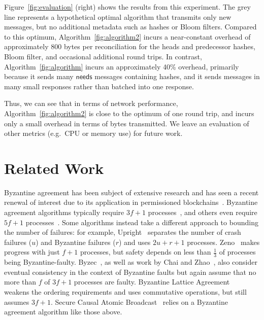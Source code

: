 \documentclass[a4paper,anonymous,USenglish]{lipics-v2019}
\begin{document}
Figure~\ref{fig:evaluation} (right) shows the results from this experiment.
The grey line represents a hypothetical optimal algorithm that transmits only new messages, but no additional metadata such as hashes or Bloom filters.
Compared to this optimum, Algorithm~\ref{fig:algorithm2} incurs a near-constant overhead of approximately 800 bytes per reconciliation for the heads and predecessor hashes, Bloom filter, and occasional additional round trips.
In contrast, Algorithm~\ref{fig:algorithm} incurs an approximately 40\% overhead, primarily because it sends many $\mathsf{needs}$ messages containing hashes, and it sends messages in many small responses rather than batched into one response.

Thus, we can see that in terms of network performance, Algorithm~\ref{fig:algorithm2} is close to the optimum of one round trip, and incurs only a small overhead in terms of bytes transmitted.
We leave an evaluation of other metrics (e.g.\ CPU or memory use) for future work.

\section{Related Work}\label{sec:relwork}

Byzantine agreement has been subject of extensive research and has seen a recent renewal of interest due to its application in permissioned blockchains~\cite{Bano:2019}.
Byzantine agreement algorithms typically require $3f+1$ processes~\cite{Castro:1999,Kotla:2007,Bessani:2014}, and others even require $5f+1$ processes~\cite{Abd:2005,Martin:2006}.
Some algorithms instead take a different approach to bounding the number of failures: for example, Upright~\cite{Clement:2009} separates the number of crash failures ($u$) and Byzantine failures ($r$) and uses $2u+r+1$ processes.
Zeno~\cite{Singh:2009} makes progress with just $f+1$ processes, but safety depends on less than $\frac{1}{3}$ of processes being Byzantine-faulty.
Byzec~\cite{Shoker:2017}, as well as work by Chai and Zhao~\cite{Chai:2014}, also consider eventual consistency in the context of Byzantine faults but again assume that no more than $f$ of $3f+1$ processes are faulty.
Byzantine Lattice Agreement~\cite{DiLuna:2020} weakens the ordering requirements and uses commutative operations, but still assumes $3f+1$.
Secure Causal Atomic Broadcast~\cite{Cachin:2001cj,Duan:2017} relies on a Byzantine agreement algorithm like those above.
\end{document}
